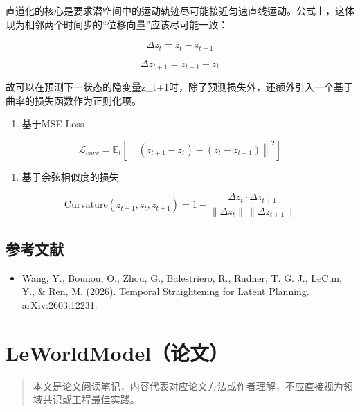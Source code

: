 直道化的核心是要求潜空间中的运动轨迹尽可能接近匀速直线运动。公式上，这体现为相邻两个时间步的``位移向量''应该尽可能一致：

\[
\Delta z_t = z_t - z_{t-1}
\]

\[
\Delta z_{t+1} = z_{t+1} - z_t
\]

故可以在预测下一状态的隐变量z\_t+1时，除了预测损失外，还额外引入一个基于曲率的损失函数作为正则化项。

\begin{enumerate}
\def\labelenumi{\arabic{enumi}.}
\tightlist
\item
  基于MSE Loss
\end{enumerate}

\[
\mathcal{L}_{curv} = \mathbb{E}_t\left[\left\| (z_{t+1}-z_t) - (z_t-z_{t-1}) \right\|^2\right]
\]

\begin{enumerate}
\def\labelenumi{\arabic{enumi}.}
\setcounter{enumi}{1}
\tightlist
\item
  基于余弦相似度的损失
\end{enumerate}

\[
\mathrm{Curvature}(z_{t-1}, z_t, z_{t+1}) = 1 - \frac{\Delta z_t \cdot \Delta z_{t+1}}{\|\Delta z_t\|\,\|\Delta z_{t+1}\|}
\]

\hypertarget{ux53c2ux8003ux6587ux732e-190}{%
\subsection{参考文献}\label{ux53c2ux8003ux6587ux732e-190}}

\begin{itemize}
\tightlist
\item
  Wang, Y., Bounou, O., Zhou, G., Balestriero, R., Rudner, T. G. J., LeCun, Y., \& Ren, M. (2026). \href{https://arxiv.org/abs/2603.12231}{Temporal Straightening for Latent Planning}. arXiv:2603.12231.
\end{itemize}

\clearpage

\hypertarget{leworldmodelux8bbaux6587}{%
\section{LeWorldModel（论文）}\label{leworldmodelux8bbaux6587}}

\begin{quote}
本文是论文阅读笔记，内容代表对应论文方法或作者理解，不应直接视为领域共识或工程最佳实践。
\end{quote}

